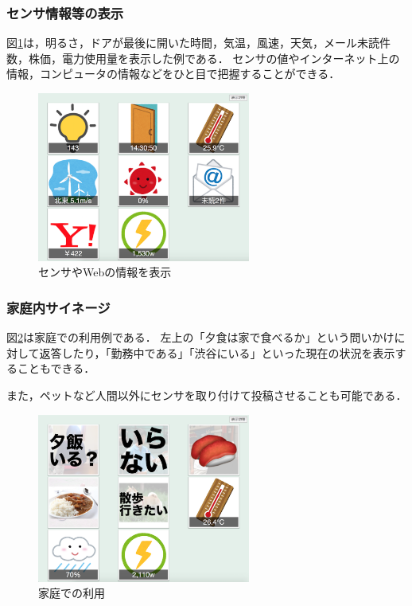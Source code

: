 \subsubsection{センサ情報等の表示}

図\ref{sensors}は，明るさ，ドアが最後に開いた時間，気温，風速，天気，メール未読件数，株価，電力使用量を表示した例である．
センサの値やインターネット上の情報，コンピュータの情報などをひと目で把握することができる．

\begin{figure}[h]
\centering
\includegraphics[width=7cm]{images/sensors.eps}
\caption{センサやWebの情報を表示}
\label{sensors}
\end{figure}

\subsubsection{家庭内サイネージ}

図\ref{home}は家庭での利用例である．
左上の「夕食は家で食べるか」という問いかけに対して返答したり，「勤務中である」「渋谷にいる」といった現在の状況を表示することもできる．

また，ペットなど人間以外にセンサを取り付けて投稿させることも可能である．

\begin{figure}[h]
\centering
\includegraphics[width=7cm]{images/home.eps}
\caption{家庭での利用}
\label{home}
\end{figure}